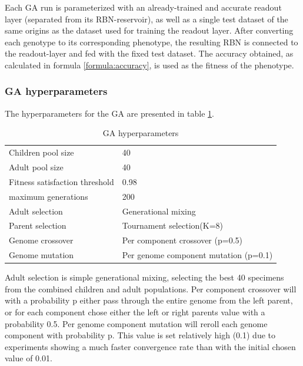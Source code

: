 Each GA run is parameterized with an already-trained and accurate readout layer (separated from its RBN-reservoir),
as well as a single test dataset of the same origins as the dataset used for training the readout layer.
After converting each genotype to its corresponding phenotype,
the resulting RBN is connected to the readout-layer and fed with the fixed test dataset.
The accuracy obtained,
as calculated in formula \ref{formula:accuracy},
is used as the fitness of the phenotype.

\subsubsection{GA hyperparameters}

The hyperparameters for the GA are presented in table \ref{table:ga-hyperparameters}.

\begin{table}
  \centering
  \caption{GA hyperparameters}
  \label{table:ga-hyperparameters}
  \begin{tabular}{ll}
    Children pool size             & 40                                    \\
    Adult pool size                & 40                                    \\
    Fitness satisfaction threshold & 0.98                                  \\
    maximum generations            & 200                                   \\
    Adult selection                & Generational mixing                   \\
    Parent selection               & Tournament selection(K=8)             \\
    Genome crossover               & Per component crossover (p=0.5)       \\
    Genome mutation                & Per genome component mutation (p=0.1) \\
  \end{tabular}
\end{table}

Adult selection is simple generational mixing,
selecting the best 40 specimens from the combined children and adult populations.
Per component crossover will with a probability p either pass through the entire genome from the left parent,
or for each component chose either the left or right parents value with a probability 0.5.
Per genome component mutation will reroll each genome component with probability p.
This value is set relatively high (0.1) due to experiments showing a much faster convergence rate than with the initial chosen value of 0.01.

